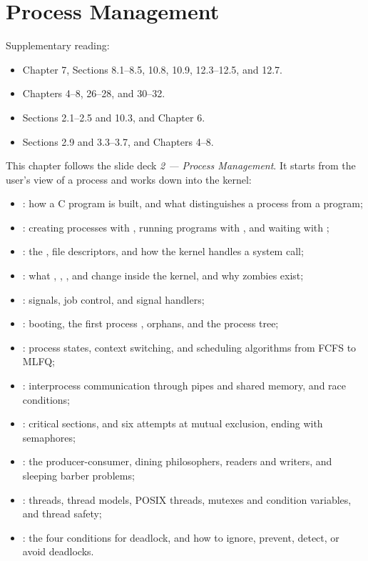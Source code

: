\chapter{Process Management}
\label{ch:proc}

Supplementary reading:
\begin{itemize}
  \item \cite{CSAPP} Chapter 7, Sections 8.1--8.5, 10.8, 10.9, 12.3--12.5, and 12.7.
  \item \cite{OSTEP} Chapters 4--8, 26--28, and 30--32.
  \item \cite{MOS} Sections 2.1--2.5 and 10.3, and Chapter 6.
  \item \cite{OSC} Sections 2.9 and 3.3--3.7, and Chapters 4--8.
\end{itemize}

This chapter follows the slide deck \emph{2 --- Process Management}. It starts from the user's view of a process and works down into the kernel:
\begin{itemize}
  \item {}: how a C program is built, and what distinguishes a process from a program;
  \item {}: creating processes with , running programs with , and waiting with ;
  \item {}: the \ts{}, file descriptors, and how the kernel handles a system call;
  \item {}: what , , , and  change inside the kernel, and why zombies exist;
  \item {}: signals, job control, and signal handlers;
  \item {}: booting, the first process , orphans, and the process tree;
  \item {}: process states, context switching, and scheduling algorithms from FCFS to MLFQ;
  \item {}: interprocess communication through pipes and shared memory, and race conditions;
  \item {}: critical sections, and six attempts at mutual exclusion, ending with semaphores;
  \item {}: the producer-consumer, dining philosophers, readers and writers, and sleeping barber problems;
  \item {}: threads, thread models, POSIX threads, mutexes and condition variables, and thread safety;
  \item {}: the four conditions for deadlock, and how to ignore, prevent, detect, or avoid deadlocks.
\end{itemize}

